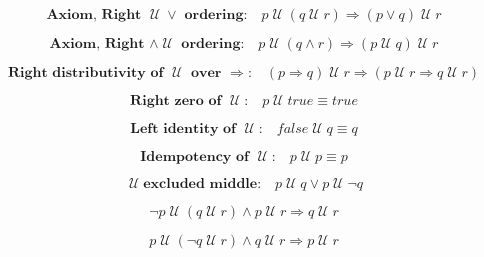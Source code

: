 \documentclass[12pt, fleqn, leqno]{article}
\newcommand{\impl}{\ensuremath{\Rightarrow}}        %
\newcommand{\Until}{\;\mathcal{U}\;}
\newcommand{\spacer}{\vspace{-30pt}}
\begin{document}
\spacer

\begin{equation}\label{E:leftAssocUntil}
\textbf{Axiom, Right $\Until \lor$ ordering:}\quad p \Until (q \Until r) \impl (p\lor q) \Until r
\end{equation}

\spacer

\begin{equation}\label{E:rightAssocUntil}
\textbf{Axiom, Right $\land \Until$ ordering:}\quad p \Until (q\land r) \impl (p \Until q) \Until r
\end{equation}

\spacer

\begin{equation}\label{E:rightUntilImplDist}
\textbf{Right distributivity of $\Until$ over $\impl$:}\quad (p \impl q) \Until r\impl (p \Until r \impl q \Until r)
\end{equation}

\spacer

\begin{equation}\label{E:zeroUntil}
\textbf{Right zero of $\Until$:}\quad p \Until true \equiv true
\end{equation}

\spacer

\begin{equation}\label{E:leftIdUntil}
\textbf{Left identity of $\Until$:}\quad false \Until q \equiv q
\end{equation}

\spacer

\begin{equation}\label{E:idemUntil}
\textbf{Idempotency of $\Until$:}\quad p \Until p \equiv p
\end{equation}

\spacer

\begin{equation}\label{E:untilExcludedMiddle}
\Until \textbf{excluded middle:}\quad p \Until q \lor p\Until \neg q
\end{equation}

\spacer

\begin{equation}\label{E:notPUntilQUntilR}
\neg p \Until (q \Until r) \land p\Until r \impl q\Until r
\end{equation}

\spacer

\begin{equation}\label{E:PUntilNotQUntilR}
p \Until (\neg q \Until r) \land q\Until r \impl p\Until r
\end{equation}
\end{document}
